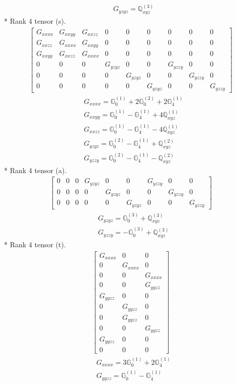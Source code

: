 \documentclass[fleqn,8pt,landscape]{jsarticle}
\begin{document}
\begin{align*}
& G_{yzyz} = \mathbb{Q}_{xyz}^{(3)}
\end{align*}
* Rank 4 tensor (s).
\begin{align*}
\begin{bmatrix} G_{xxxx} & G_{xxyy} & G_{xxzz} & 0 & 0 & 0 & 0 & 0 & 0 \\ G_{xxzz} & G_{xxxx} & G_{xxyy} & 0 & 0 & 0 & 0 & 0 & 0 \\ G_{xxyy} & G_{xxzz} & G_{xxxx} & 0 & 0 & 0 & 0 & 0 & 0 \\ 0 & 0 & 0 & G_{yzyz} & 0 & 0 & G_{yzzy} & 0 & 0 \\ 0 & 0 & 0 & 0 & G_{yzyz} & 0 & 0 & G_{yzzy} & 0 \\ 0 & 0 & 0 & 0 & 0 & G_{yzyz} & 0 & 0 & G_{yzzy} \end{bmatrix}
\end{align*}
\begin{align*}
& G_{xxxx} = \mathbb{G}_{0}^{(1)} + 2 \mathbb{G}_{0}^{(2)} + 2 \mathbb{G}_{4}^{(1)} \\
& G_{xxyy} = \mathbb{G}_{0}^{(1)} - \mathbb{G}_{4}^{(1)} + 4 \mathbb{Q}_{xyz}^{(1)} \\
& G_{xxzz} = \mathbb{G}_{0}^{(1)} - \mathbb{G}_{4}^{(1)} - 4 \mathbb{Q}_{xyz}^{(1)} \\
& G_{yzyz} = \mathbb{G}_{0}^{(2)} - \mathbb{G}_{4}^{(1)} + \mathbb{Q}_{xyz}^{(2)} \\
& G_{yzzy} = \mathbb{G}_{0}^{(2)} - \mathbb{G}_{4}^{(1)} - \mathbb{Q}_{xyz}^{(2)}
\end{align*}
* Rank 4 tensor (a).
\begin{align*}
\begin{bmatrix} 0 & 0 & 0 & G_{yzyz} & 0 & 0 & G_{yzzy} & 0 & 0 \\ 0 & 0 & 0 & 0 & G_{yzyz} & 0 & 0 & G_{yzzy} & 0 \\ 0 & 0 & 0 & 0 & 0 & G_{yzyz} & 0 & 0 & G_{yzzy} \end{bmatrix}
\end{align*}
\begin{align*}
& G_{yzyz} = \mathbb{G}_{0}^{(3)} + \mathbb{Q}_{xyz}^{(3)} \\
& G_{yzzy} = - \mathbb{G}_{0}^{(3)} + \mathbb{Q}_{xyz}^{(3)}
\end{align*}
* Rank 4 tensor (t).
\begin{align*}
\begin{bmatrix} G_{xxxx} & 0 & 0 \\ 0 & G_{xxxx} & 0 \\ 0 & 0 & G_{xxxx} \\ 0 & 0 & G_{yyzz} \\ G_{yyzz} & 0 & 0 \\ 0 & G_{yyzz} & 0 \\ 0 & G_{yyzz} & 0 \\ 0 & 0 & G_{yyzz} \\ G_{yyzz} & 0 & 0 \\ 0 & 0 & 0 \end{bmatrix}
\end{align*}
\begin{align*}
& G_{xxxx} = 3 \mathbb{G}_{0}^{(1)} + 2 \mathbb{G}_{4}^{(1)} \\
& G_{yyzz} = \mathbb{G}_{0}^{(1)} - \mathbb{G}_{4}^{(1)}
\end{align*}
\end{document}
